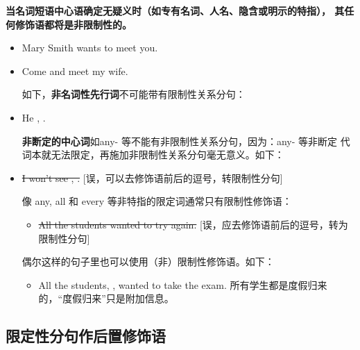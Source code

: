 \textbf{当名词短语中心语确定无疑义时（如专有名词、人名、隐含或明示的特指），
  其任何修饰语都将是非限制性的。}
\begin{itemize}
\item Mary Smith wants to meet you.
\item Come and meet my  wife.

  如下，\textbf{非名词性先行词}不可能带有限制性关系分句：

\item He , .


  \textbf{非断定的中心词}如any- 等不能有非限制性关系分句，因为：any- 等非断定
  代词本就无法限定，再施加非限制性关系分句毫无意义。如下：

\item \sout{I won't see , .} [误，可以去修饰语前后的逗号，转限制性分句]

  像 any, all 和 every 等非特指的限定词通常只有限制性修饰语：
  \begin{itemize}
  \item \sout{All the students wanted to
      try again.} [误，应去修饰语前后的逗号，转为限制性分句]

  \end{itemize}

  偶尔这样的句子里也可以使用（非）限制性修饰语。如下：
  \begin{itemize}
  \item All the students, , wanted
    to take the exam.
    所有学生都是度假归来的，“度假归来”只是附加信息。
\end{itemize}


\end{itemize}

\subsection{限定性分句作后置修饰语}

